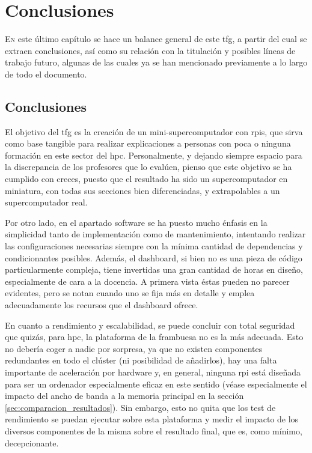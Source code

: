 \chapter{Conclusiones}
\label{chap:conclusiones}

\lettrine{E}{n} este último capítulo se hace un balance general de este \acrlong{tfg}, a partir del cual se extraen conclusiones, así como su relación con la titulación y posibles líneas de trabajo futuro, algunas de las cuales ya se han mencionado previamente a lo largo de todo el documento.

\section{Conclusiones}
El objetivo del \acrshort{tfg} es la creación de un mini-supercomputador con \acrlong{rpi}s, que sirva como base tangible para realizar explicaciones a personas con poca o ninguna formación en este sector del \acrshort{hpc}. Personalmente, y dejando siempre espacio para la discrepancia de los profesores que lo evalúen, pienso que este objetivo se ha cumplido con creces, puesto que el resultado ha sido un supercomputador en miniatura, con todas sus secciones bien diferenciadas, y extrapolables a un supercomputador real. 

Por otro lado, en el apartado software se ha puesto mucho énfasis en la simplicidad tanto de implementación como de mantenimiento, intentando realizar las configuraciones necesarias siempre con la mínima cantidad de dependencias y condicionantes posibles. Además, el dashboard, si bien no es una pieza de código particularmente compleja, tiene invertidas una gran cantidad de horas en diseño, especialmente de cara a la docencia. A primera vista éstas pueden no parecer evidentes, pero se notan cuando uno se fija más en detalle y emplea adecuadamente los recursos que el dashboard ofrece.

En cuanto a rendimiento y escalabilidad, se puede concluir con total seguridad que quizás, para \acrshort{hpc}, la plataforma de la frambuesa no es la más adecuada. Esto no debería coger a nadie por sorpresa, ya que no existen componentes redundantes en todo el clúster (ni posibilidad de añadirlos), hay una falta importante de aceleración por hardware y, en general, ninguna \acrlong{rpi} está diseñada para ser un ordenador especialmente eficaz en este sentido (véase especialmente el impacto del ancho de banda a la memoria principal en la sección \ref{sec:comparacion_resultados}). Sin embargo, esto no quita que los test de rendimiento se puedan ejecutar sobre esta plataforma y medir el impacto de los diversos componentes de la misma sobre el resultado final, que es, como mínimo, decepcionante.

